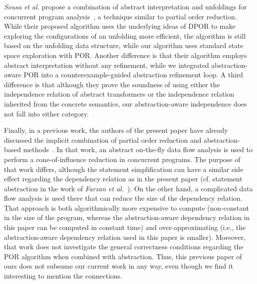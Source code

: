 \documentclass[numbook]{svjour3}
\begin{document}
\emph{Sousa et al.} propose a combination of abstract interpretation and unfoldings for concurrent program analysis~\cite{sousa_abstract_unfoldings, sousa_abstractions_independence}, a technique similar to partial order reduction. While their proposed algorithm uses the underlying ideas of DPOR to make exploring the configurations of an unfolding more efficient, the algorithm is still based on the unfolding data structure, while our algorithm uses standard state space exploration with POR. Another difference is that their algorithm employs abstract interpretation without any refinement, while we integrated abstraction-aware POR into a counterexample-guided abstraction refinement loop. A third difference is that although they prove the soundness of using either the independence relation of abstract transformers or the independence relation inherited from the concrete semantics, our abstraction-aware independence does not fall into either category.

Finally, in a previous work, the authors of the present paper have already discussed the implicit combination of partial order reduction and abstraction-based methods~\cite{spin25coi}. In that work, an abstract on-the-fly data flow analysis is used to perform a cone-of-influence reduction in concurrent programs. The purpose of that work differs, although the statement simplification can have a similar side effect regarding the dependency relation as in the present paper (cf. statement abstraction in the work of \emph{Farzan et al.}~\cite{farzan_stratified_commutativity}). On the other hand, a complicated data flow analysis is used there that can reduce the size of the dependency relation. That approach is both algorithmically more expensive to compute (non-constant in the size of the program, whereas the abstraction-aware dependency relation in this paper can be computed in constant time) and over-approximating (i.e., the abstraction-aware dependency relation used in this paper is smaller). Moreover, that work does not investigate the general correctness conditions regarding the POR algorithm when combined with abstraction. Thus, this previous paper of ours does not subsume our current work in any way, even though we find it interesting to mention the connections.




\end{document}
